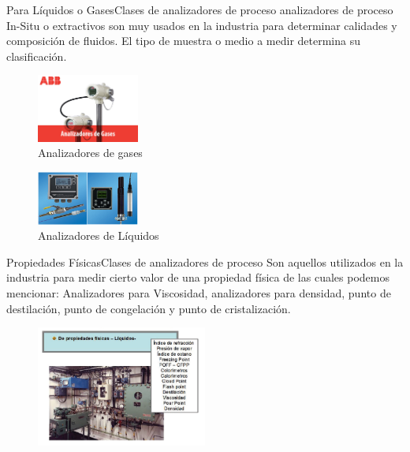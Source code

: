 \documentclass[10pt]{beamer}
\begin{document}
{%
\begin{frame}{Para Líquidos o Gases}{Clases de analizadores de proceso}
analizadores de proceso In-Situ o extractivos son muy usados en la industria para determinar calidades y composición de fluidos. El tipo de muestra o medio a medir determina su clasificación. 
\begin{figure}%
\includegraphics[width=0.3\textwidth]{figura_8.jpg} %
\caption{\label{fig:4}Analizadores de gases} %
\end{figure}
\begin{figure}%
\includegraphics[width=0.3\textwidth]{figura_9.jpg} %
\caption{\label{fig:5}Analizadores de Líquidos} %
\end{figure}
\end{frame}
  \begin{frame}{Propiedades Físicas}{Clases de analizadores de proceso}
Son aquellos utilizados en la industria para medir cierto valor de una propiedad física de las cuales podemos mencionar:
Analizadores para Viscosidad, analizadores para densidad, punto de destilación, punto de congelación y punto de cristalización. 
\begin{figure}%
\includegraphics[width=0.5\textwidth]{figura_10.png} %

\end{figure}
\end{frame}}
\end{document}
